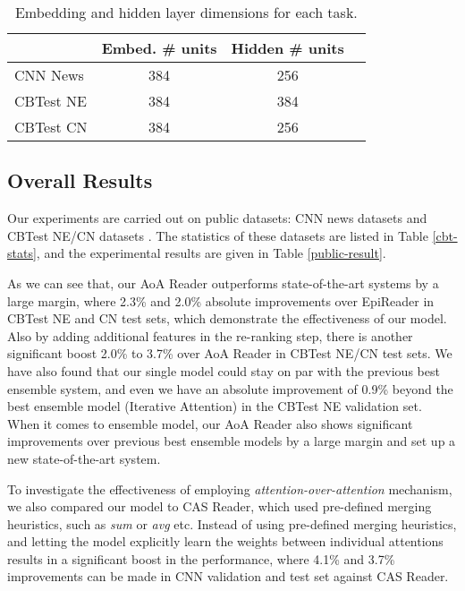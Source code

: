 \documentclass[11pt,a4paper]{article}
\begin{document}
        \begin{table}[hbp]
        \begin{center}
        \begin{tabular}{lccc}
        \toprule
        & Embed. \# units & Hidden \# units\\
        \midrule
        CNN News & 384 & 256 \\
        CBTest NE & 384 & 384 \\
        CBTest CN & 384 & 256 \\
        \bottomrule
        \end{tabular}
        \end{center}
        \caption{\label{dim-stats} Embedding and hidden layer dimensions for each task.}
        \end{table}
        
\subsection{Overall Results}        

Our experiments are carried out on public datasets: CNN news datasets \cite{hermann-etal-2015} and CBTest NE/CN datasets \cite{hill-etal-2015}.
The statistics of these datasets are listed in Table \ref{cbt-stats}, and the experimental results are given in Table \ref{public-result}.

As we can see that, our AoA Reader outperforms state-of-the-art systems by a large margin, where 2.3\% and 2.0\% absolute improvements over EpiReader in CBTest NE and CN test sets, which demonstrate the effectiveness of our model.
Also by adding additional features in the re-ranking step, there is another significant boost  2.0\% to 3.7\% over AoA Reader in CBTest NE/CN test sets.
We have also found that our single model could stay on par with the previous best ensemble system, and even we have an absolute improvement of 0.9\% beyond the best ensemble model (Iterative Attention) in the CBTest NE validation set. 
When it comes to ensemble model, our AoA Reader also shows significant improvements over previous best ensemble models by a large margin and set up a new state-of-the-art system. 

To investigate the effectiveness of employing {\em attention-over-attention} mechanism, we also compared our model to CAS Reader, which used pre-defined merging heuristics, such as {\em sum} or {\em avg} etc.
Instead of using pre-defined merging heuristics, and letting the model explicitly learn the weights between individual attentions results in a significant boost in the performance, where 4.1\% and 3.7\% improvements can be made in CNN validation and test set against CAS Reader.
\end{document}
